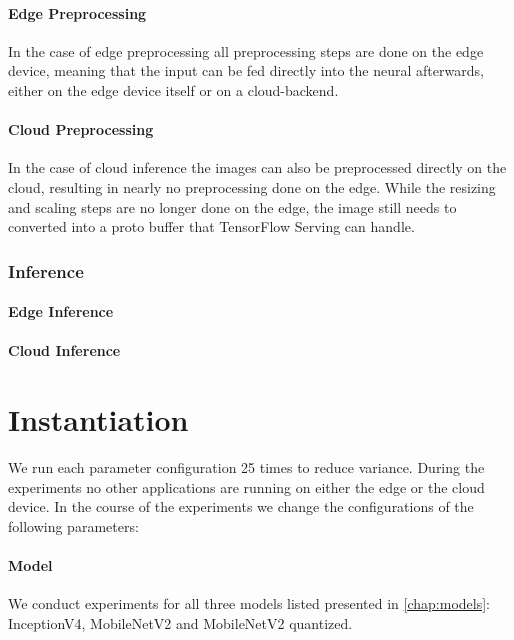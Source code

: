 \paragraph{Edge Preprocessing}
In the case of edge preprocessing all preprocessing steps are done on the edge device, meaning that the input can be fed directly into the neural afterwards, either on the edge device itself or on a cloud-backend.
\paragraph{Cloud Preprocessing}
In the case of cloud inference the images can also be preprocessed directly on the cloud, resulting in nearly no preprocessing done on the edge. While the resizing and scaling steps are no longer done on the edge, the image still needs to converted into a proto buffer that TensorFlow Serving can handle.
\subsubsection{Inference}
\paragraph{Edge Inference}
\paragraph{Cloud Inference}
\section{Instantiation}
We run each parameter configuration 25 times to reduce variance. During the experiments no other applications are running on either the edge or the cloud device.
In the course of the experiments we change the configurations of the following parameters:
\paragraph{Model}
We conduct experiments for all three models listed presented in \ref{chap:models}: InceptionV4, MobileNetV2 and MobileNetV2 quantized.
